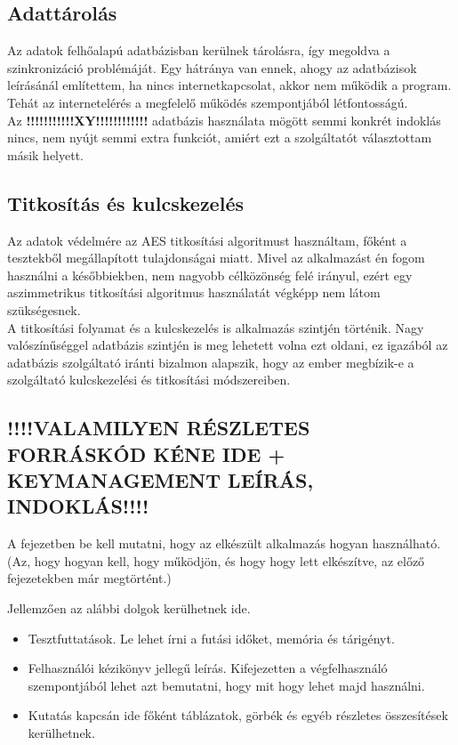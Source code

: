 		






\subsection{Adattárolás}

Az adatok felhőalapú adatbázisban kerülnek tárolásra, így megoldva a szinkronizáció problémáját. Egy hátránya van ennek, ahogy az adatbázisok leírásánál említettem, ha nincs internetkapcsolat, akkor nem működik a program. Tehát az internetelérés a megfelelő működés szempontjából létfontosságú.
\vspace{5pt} \\Az \textbf{!!!!!!!!!!!XY!!!!!!!!!!!!} adatbázis használata mögött semmi konkrét indoklás nincs, nem nyújt semmi extra funkciót, amiért ezt a szolgáltatót választottam másik helyett.

\subsection{Titkosítás és kulcskezelés}

Az adatok védelmére az AES titkosítási algoritmust használtam, főként a tesztekből megállapított tulajdonságai miatt. Mivel az alkalmazást én fogom használni a későbbiekben, nem nagyobb célközönség felé irányul, ezért egy aszimmetrikus titkosítási algoritmus használatát végképp nem látom szükségesnek.
\\A titkosítási folyamat és a kulcskezelés is alkalmazás szintjén történik. Nagy valószínűséggel adatbázis szintjén is meg lehetett volna ezt oldani, ez igazából az adatbázis szolgáltató iránti bizalmon alapszik, hogy az ember megbízik-e a szolgáltató kulcskezelési és titkosítási módszereiben.

\subsection{!!!!VALAMILYEN RÉSZLETES FORRÁSKÓD KÉNE IDE + KEYMANAGEMENT LEÍRÁS, INDOKLÁS!!!!}



\newpage
A fejezetben be kell mutatni, hogy az elkészült alkalmazás hogyan használható.
(Az, hogy hogyan kell, hogy működjön, és hogy hogy lett elkészítve, az előző fejezetekben már megtörtént.)

Jellemzően az alábbi dolgok kerülhetnek ide.
\begin{itemize}
\item Tesztfuttatások. Le lehet írni a futási időket, memória és tárigényt.
\item Felhasználói kézikönyv jellegű leírás. Kifejezetten a végfelhasználó szempontjából lehet azt bemutatni, hogy mit hogy lehet majd használni.
\item Kutatás kapcsán ide főként táblázatok, görbék és egyéb részletes összesítések kerülhetnek.
\end{itemize}

